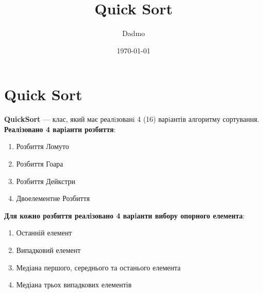 \documentclass{article}
\title{Quick Sort}
\author{Dadmo}
\date{\today}
\begin{document}
\maketitle

\tableofcontents 
\section{Quick Sort}
\textbf{QuickSort} --- клас, який має реалiзованi 4 (16) варiантів алгоритму сортування.
\newline
\textbf{Реалiзовано 4 варiанти розбиття}: 
\begin{enumerate}
    \item Розбиття Ломуто
    \item Розбиття Гоара
    \item Розбиття Дейкстри
    \item Двоелементне Розбиття
\end{enumerate}
\textbf{Для кожно розбиття реалiзовано 4 варiанти вибору опорного елемента}:
\begin{enumerate}
    \item Останній елемент
    \item Випадковий елемент
    \item Медіана першого, середнього та останього елемента
    \item Медіана трьох випадкових елементів
\end{enumerate}
\end{document}
